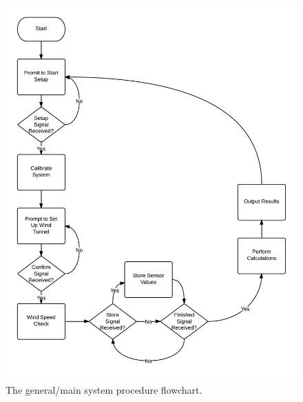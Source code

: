 	\begin{figure}[H]
		\centering
			\includegraphics[scale=0.25]{img/flowchart-outline}
		\caption{The general/main system procedure flowchart.}
	\end{figure}
